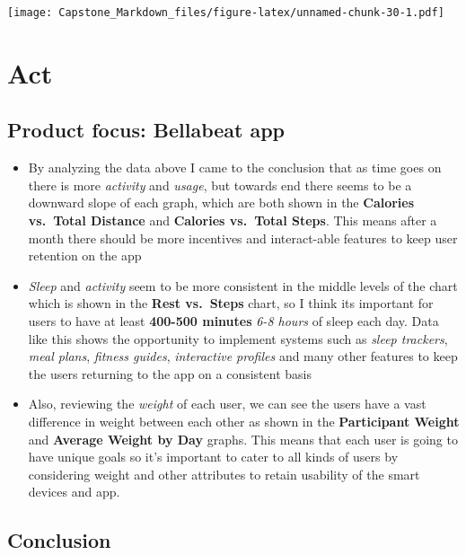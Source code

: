 \documentclass[
]{article}
\begin{document}
\texttt{[image: Capstone\_Markdown\_files/figure-latex/unnamed-chunk-30-1.pdf]}

\hypertarget{act}{%
\section{\texorpdfstring{\textbf{Act}}{Act}}\label{act}}

\hypertarget{product-focus-bellabeat-app}{%
\subsection{\texorpdfstring{\textbf{Product focus: Bellabeat
app}}{Product focus: Bellabeat app}}\label{product-focus-bellabeat-app}}

\begin{itemize}
\item
  By analyzing the data above I came to the conclusion that as time goes
  on there is more \emph{activity} and \emph{usage}, but towards end
  there seems to be a downward slope of each graph, which are both shown
  in the \textbf{Calories vs.~Total Distance} and \textbf{Calories
  vs.~Total Steps}. This means after a month there should be more
  incentives and interact-able features to keep user retention on the
  app
\item
  \emph{Sleep} and \emph{activity} seem to be more consistent in the
  middle levels of the chart which is shown in the \textbf{Rest
  vs.~Steps} chart, so I think its important for users to have at least
  \textbf{400-500 minutes} \emph{6-8 hours} of sleep each day. Data like
  this shows the opportunity to implement systems such as \emph{sleep
  trackers}, \emph{meal plans}, \emph{fitness guides}, \emph{interactive
  profiles} and many other features to keep the users returning to the
  app on a consistent basis
\item
  Also, reviewing the \emph{weight} of each user, we can see the users
  have a vast difference in weight between each other as shown in the
  \textbf{Participant Weight} and \textbf{Average Weight by Day} graphs.
  This means that each user is going to have unique goals so it's
  important to cater to all kinds of users by considering weight and
  other attributes to retain usability of the smart devices and app.
\end{itemize}

\hypertarget{conclusion}{%
\subsection{\texorpdfstring{\textbf{Conclusion}}{Conclusion}}\label{conclusion}}
\end{document}
